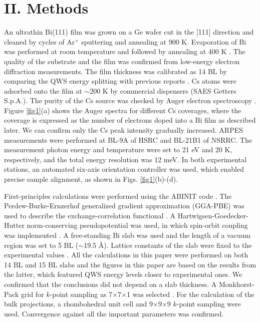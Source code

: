 \documentclass[reprint,secnumarabic,amssymb, nobibnotes, aps, prl,superscriptaddress,showpacs]{revtex4-1}
\begin{document}
\section{II. Methods}
An ultrathin Bi(111) film was grown on a Ge wafer cut in the [111] direction and cleaned by cycles of Ar$^+$ sputtering and annealing at 900 K. Evaporation of Bi was performed at room temperature and followed by annealing at 400 K \cite{hatta2009}. The quality of the substrate and the film was confirmed from low-energy electron diffraction measurements. The film thickness was calibrated as 14 BL by comparing the QWS energy splitting with previous reports \cite{hirahara2007,bian2009,takayama2012,ito2016}. Cs atoms were adsorbed onto the film at $\sim$200 K by commercial dispensers (SAES Getters S.p.A.). The purity of the Cs source was checked by Auger electron spectroscopy \cite{davis1976}. Figure \ref{fig1}(a) shows the Auger spectra for different Cs coverages, where the coverage is expressed as the number of electrons doped into a Bi film as described later. We can confirm only the Cs peak intensity gradually increased. ARPES measurements were performed at BL-9A of HSRC and BL-21B1 of NSRRC. The measurement photon energy and temperature were set to 21 eV and 20 K, respectively, and the total energy resolution was 12 meV. In both experimental stations, an automated six-axis orientation controller was used, which enabled precise sample alignment, as shown in Figs. \ref{fig1}(b)-(d).

First-principles calculations were performed using the ABINIT code \cite{gonze2002}. The Perdew-Burke-Ernzerhof generalized gradient approximation (GGA-PBE) was used to describe the exchange-correlation functional \cite{perdew1996}. A Hartwigsen-Goedecker-Hutter norm-conserving pseudopotential was used, in which spin-orbit coupling was implemented \cite{hartwigsen1998}. A free-standing Bi slab was used and the length of a vacuum region was set to 5 BL ($\sim$19.5 \AA). Lattice constants of the slab were fixed to the experimental values \cite{cucka1962,liu1995}. All the calculations in this paper were performed on both 14 BL and 15 BL slabs and the figures in this paper are based on the results from the latter, which featured QWS energy levels closer to experimental ones. We confirmed that the conclusions did not depend on a slab thickness. A Monkhorst-Pack grid for $k$-point sampling as 7$\times$7$\times$1 was selected \cite{monkhorst1976}. For the calculation of the bulk projections, a rhombohedral unit cell and 9$\times$9$\times$9 $k$-point sampling were used. Convergence against all the important parameters was confirmed. 
\end{document}
